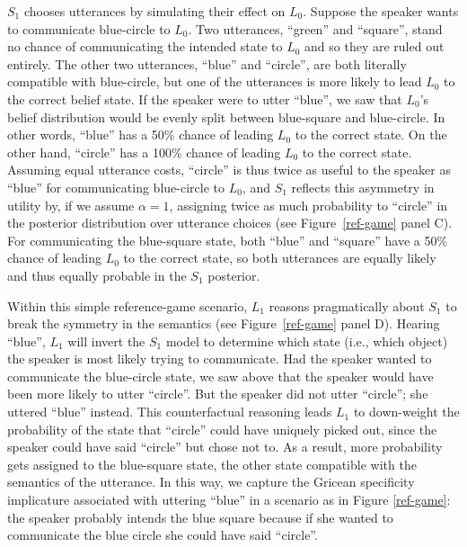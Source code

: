 \documentclass{sp}
\begin{document}
$S_1$ chooses utterances by simulating their effect on $L_0$. Suppose the speaker wants to communicate blue-circle to $L_0$. Two utterances, ``green'' and ``square'', stand no chance of communicating the intended state to $L_0$ and so they are ruled out entirely. The other two utterances, ``blue'' and ``circle'', are both literally compatible with blue-circle, but one of the utterances is more likely to lead $L_0$ to the correct belief state. If the speaker were to utter ``blue'', we saw that $L_0$'s belief distribution would be evenly split between blue-square and blue-circle. In other words, ``blue'' has a 50\% chance of leading $L_0$ to the correct state. On the other hand, ``circle'' has a 100\% chance of leading $L_0$ to the correct state. Assuming equal utterance costs, ``circle'' is thus twice as useful to the speaker as ``blue'' for communicating blue-circle to $L_0$, and $S_1$ reflects this asymmetry in utility by, if we assume $\alpha=1$, assigning twice as much probability to ``circle'' in the posterior distribution over utterance choices (see Figure~\ref{ref-game} panel C). For communicating the blue-square state, both ``blue'' and ``square'' have a 50\% chance of leading $L_0$ to the correct state, so both utterances are equally likely and thus equally probable in the $S_1$ posterior.

Within this simple reference-game scenario, $L_1$ reasons pragmatically about $S_1$ to break the symmetry in the semantics (see Figure~\ref{ref-game} panel D). Hearing ``blue'', $L_1$ will invert the $S_1$ model to determine which state (i.e., which object) the speaker is most likely trying to communicate. Had the speaker wanted to communicate the blue-circle state, we saw above that the speaker would have been more likely to utter ``circle''. But the speaker did not utter ``circle''; she uttered ``blue'' instead. This counterfactual reasoning leads $L_1$ to down-weight the probability of the state that ``circle'' could have uniquely picked out, since the speaker could have said ``circle'' but chose not to. As a result, more probability gets assigned to the blue-square state, the other state compatible with the semantics of the utterance. In this way, we capture the Gricean specificity implicature associated with uttering ``blue'' in a scenario as in Figure \ref{ref-game}: the speaker probably intends the blue square because if she wanted to communicate the blue circle she could have said ``circle''.
\end{document}
